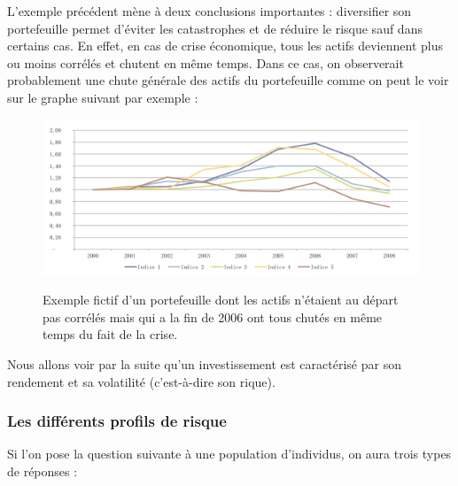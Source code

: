 L'exemple précédent mène à deux conclusions importantes : diversifier son portefeuille permet d'éviter les catastrophes et de réduire le risque sauf dans certains cas. En effet, en cas de crise économique, tous les actifs deviennent plus ou moins corrélés et chutent en même temps. Dans ce cas, on observerait probablement une chute générale des actifs du portefeuille comme on peut le voir sur le graphe suivant par exemple :
	  \begin{figure}[H]
	    \center
	    \includegraphics[scale=0.4]{../graph/exemplePortefeuilleChute.png} \\
	    \caption{Exemple fictif d'un portefeuille dont les actifs n'étaient au départ pas corrélés mais qui a la fin de 2006 ont tous chutés en même temps du fait de la crise.}
	  \end{figure}
Nous allons voir par la suite qu'un investissement est caractérisé par son rendement et sa volatilité (c'est-à-dire son rique).

\subsubsection{Les différents profils de risque}
Si l'on pose la question suivante à une population d'individus, on aura trois types de réponses :\\

